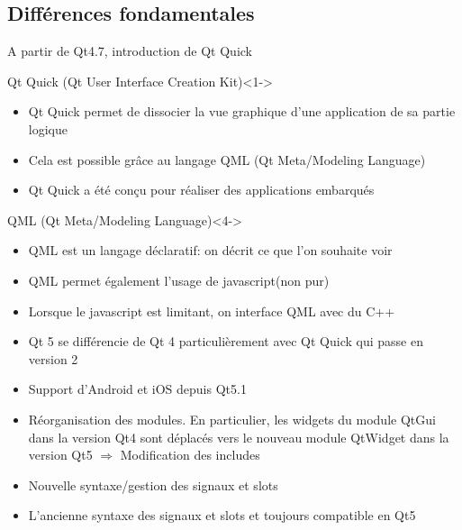\documentclass{beamer} %
\begin{document}
\subsection{Différences fondamentales}
\begin{frame}{A partir de Qt4.7, introduction de Qt Quick}
			\begin{block}{Qt Quick (Qt User Interface Creation Kit)}<1->
				\begin{itemize}
				\item<1->Qt Quick permet de dissocier la vue graphique d'une application de sa partie logique
				\item<2->Cela est possible grâce au langage QML (Qt Meta/Modeling Language) 
				\item<3->Qt Quick a été conçu pour réaliser des applications embarqués
				\end{itemize}
			\end{block}
			\begin{block}{QML (Qt Meta/Modeling Language)}<4->
				\begin{itemize}
				\item<4-> QML est un langage déclaratif: on décrit ce que l'on souhaite voir
				\item<5-> QML permet également l'usage de javascript(non pur) 
			\item<6->Lorsque le javascript est limitant, on interface QML avec du C++				  \end{itemize} 
			\end{block}
\end{frame}

\begin{frame}
	\begin{itemize}
		\item<1-> Qt 5 se différencie de Qt 4 particulièrement avec Qt Quick qui passe en version 2
		\item<2-> Support d'Android et iOS depuis Qt5.1
		\item<3-> Réorganisation des modules. En particulier, les widgets du module QtGui dans la version Qt4 sont déplacés vers le nouveau module QtWidget dans la version Qt5 \color{red} $ \Rightarrow $ Modification des includes \color{black}
		\item<4-> Nouvelle syntaxe/gestion des signaux et slots
		\item<5-> L'ancienne syntaxe des signaux et slots et toujours compatible en Qt5
	\end{itemize}
\end{frame}
\end{document}
